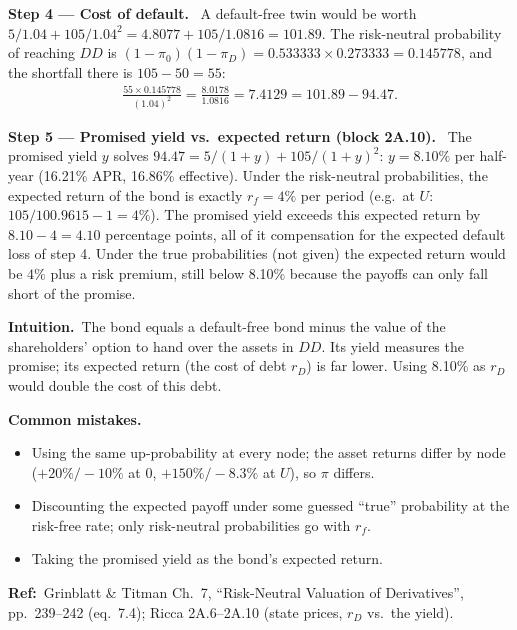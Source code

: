 \documentclass[11pt,a4paper]{article}
\newcommand{\step}[2]{\par\medskip\noindent\textbf{Step #1 --- #2.}~}
\newcommand{\intuition}{\par\medskip\noindent\textbf{Intuition.}~}
\newcommand{\refbib}{\par\smallskip\noindent\textbf{Ref:}~}
\newcommand{\pitfalls}{\par\medskip\noindent\textbf{Common mistakes.}}
\begin{document}
\step{4}{Cost of default} A default-free twin would be worth $5/1.04+105/1.04^2 = 4.8077+105/1.0816 = 101.89$. The risk-neutral
probability of reaching $DD$ is $(1-\pi_0)(1-\pi_D)=0.533333\times0.273333=0.145778$, and the shortfall there is $105-50=55$:
\begin{align}
  \frac{55\times0.145778}{(1.04)^2} = \frac{8.0178}{1.0816} = 7.4129 = 101.89-94.47. \label{r2be15-loss}
\end{align}

\step{5}{Promised yield vs.\ expected return (block 2A.10)} The promised yield $y$ solves $94.47 = 5/(1+y)+105/(1+y)^2$: $y=8.10\%$
per half-year (16.21\% APR, 16.86\% effective). Under the risk-neutral probabilities, the expected return of the bond is exactly
$r_f=4\%$ per period (e.g.\ at $U$: $105/100.9615-1=4\%$). The promised yield exceeds this expected return by $8.10-4=4.10$
percentage points, all of it compensation for the expected default loss of step 4. Under the true probabilities (not given) the
expected return would be $4\%$ plus a risk premium, still below 8.10\% because the payoffs can only fall short of the promise.

\intuition The bond equals a default-free bond minus the value of the shareholders' option to hand over the assets in $DD$. Its
yield measures the promise; its expected return (the cost of debt $r_D$) is far lower. Using 8.10\% as $r_D$ would double the cost of
this debt.
\pitfalls
\begin{itemize}
  \item Using the same up-probability at every node; the asset returns differ by node ($+20\%/-10\%$ at 0, $+150\%/-8.3\%$ at $U$), so $\pi$ differs.
  \item Discounting the expected payoff under some guessed ``true'' probability at the risk-free rate; only risk-neutral probabilities go with $r_f$.
  \item Taking the promised yield as the bond's expected return.
\end{itemize}
\refbib{Grinblatt \& Titman Ch.~7, ``Risk-Neutral Valuation of Derivatives'', pp.~239--242 (eq.~7.4); Ricca 2A.6--2A.10 (state prices, $r_D$ vs.\ the yield).}
\end{document}
